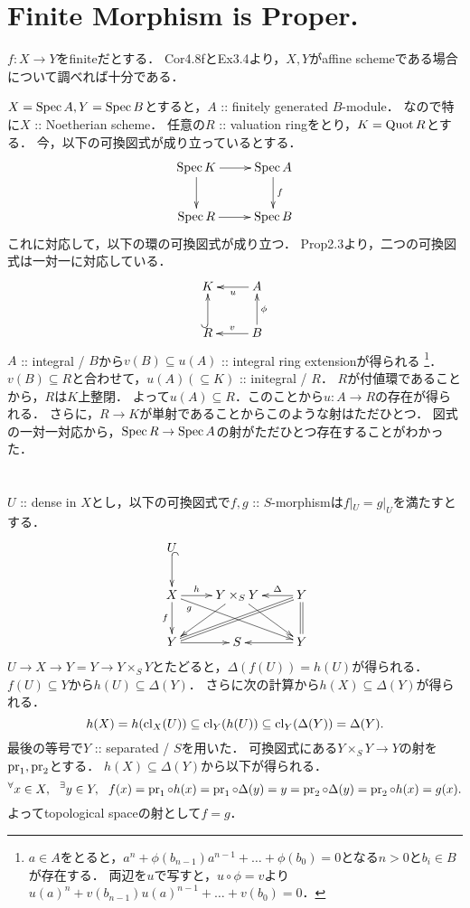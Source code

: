 \documentclass[a4paper]{jsarticle}
\begin{document}
\section{Finite Morphism is Proper.} %
    $f: X \to Y$をfiniteだとする．
    Cor4.8fとEx3.4より，$X,Y$がaffine schemeである場合について調べれば十分である．

    $X=\operatorname{Spec} A, Y=\operatorname{Spec} B$とすると，$A$ :: finitely generated $B$-module．
    なので特に$X$ :: Noetherian scheme．
    任意の$R$ :: valuation ringをとり，$K=\operatorname{Quot} R$とする．
    今，以下の可換図式が成り立っているとする．
    \[
    \xymatrix
    {
        \Spec K \ar[d] \ar[r]& \Spec A \ar[d]^-{f} \\
        \Spec R \ar[r] & \Spec B
    }
    \]
    これに対応して，以下の環の可換図式が成り立つ．
    Prop2.3より，二つの可換図式は一対一に対応している．
    \[
    \xymatrix
    {
        K  & A \ar[l]^-{u} \\
        R  \ar@{^{(}->}[u]& B \ar[u]_-{\phi} \ar[l]_-{v}
    }
    \]
    $A$ :: integral / $B$から$v(B) \subseteq u(A)$ :: integral ring extensionが得られる
    \footnote
    {
        $a \in A$をとると，$a^n+\phi(b_{n-1})a^{n-1}+\dots+\phi(b_0)=0$となる$n>0$と$b_i \in B$が存在する．
        両辺を$u$で写すと，$u \circ \phi=v$より$u(a)^n+v(b_{n-1})u(a)^{n-1}+\dots+v(b_0)=0$．
    }．
    $v(B) \subseteq R$と合わせて，$u(A)(\subseteq K)$ :: initegral / $R$．
    $R$が付値環であることから，$R$は$K$上整閉．
    よって$u(A) \subseteq R$．このことから$u: A \to R$の存在が得られる．
    さらに，$R \to K$が単射であることからこのような射はただひとつ．
    図式の一対一対応から，$\operatorname{Spec} R \to \operatorname{Spec} A$の射がただひとつ存在することがわかった．

\section{ } %
    $U$ :: dense in $X$とし，以下の可換図式で$f,g$ :: $S$-morphismは$f|_U=g|_U$を満たすとする．
    \[
    \xymatrix
    {
        U \ar@{^{(}->}[d]& {} & {} \\
        X \ar[r]^-{h} \ar[d]_-{f}\ar[rrd]_(0.15){g}& \ar[ld] Y \times_S Y \ar[rd] &\ar@{=}[lld]\ar@{=}[d] \ar[l]_-{\Delta} Y \\
        Y \ar[r]& S & \ar[l]Y
    }
    \]
    $U \to X \to Y=Y \to Y \times_S Y$とたどると，$\Delta(f(U))=h(U)$が得られる．
    $f(U) \subseteq Y$から$h(U) \subseteq \Delta(Y)$．
    さらに次の計算から$h(X) \subseteq \Delta(Y)$が得られる．
    \[ h(X)=h(\operatorname{cl}_X(U)) \subseteq \operatorname{cl}_Y(h(U)) \subseteq \operatorname{cl}_Y(\Delta(Y))=\Delta(Y). \]
    最後の等号で$Y$ :: separated / $S$を用いた．
    可換図式にある$Y \times_S Y \to Y$の射を$\operatorname{pr}_1, \operatorname{pr}_2$とする．
    $h(X) \subseteq \Delta(Y)$から以下が得られる．
    \[
        {}^{\forall} x \in X,~~ {}^{\exists} y \in Y,~~
        f(x)=\operatorname{pr}_1 \circ h(x)=\operatorname{pr}_1 \circ \Delta(y)=y=\operatorname{pr}_2 \circ \Delta(y)=\operatorname{pr}_2 \circ h(x)=g(x).
    \]
    よってtopological spaceの射として$f=g$．
\end{document}

